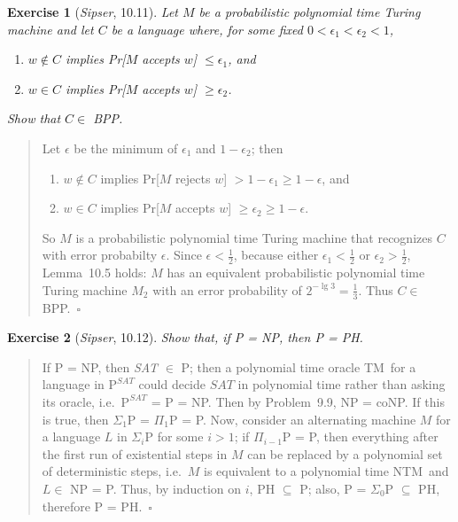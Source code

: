 \documentclass{article}
\theoremstyle{break}			%
\newtheorem{exercise}{Exercise}
\theoremstyle{plain}
\newenvironment{answer}{\begin{quotation}\noindent}{\end{quotation}}
\newcommand{\sipser}{\textit{Sipser}}
\newcommand{\qed}{~\ensuremath{\square}}
\newcommand{\setname}[1]{\textit{#1}}
\newcommand{\TM}{\textsf{TM}}
\newcommand{\NTM}{\textsf{NTM}}
\renewcommand{\P}{\textrm{P}}
\begin{document}
\begin{exercise}[\sipser, 10.11]
Let $M$ be a probabilistic polynomial time Turing machine and let $C$
be a language where, for some fixed $0<\epsilon_1<\epsilon_2<1$,
\begin{enumerate}
\renewcommand{\theenumi}{\alph{enumi}}
\item $w\not\in C$ implies Pr[$M$ accepts $w$] $\leq\epsilon_1$, and
\item $w\in C$ implies Pr[$M$ accepts $w$] $\geq\epsilon_2$.
\end{enumerate}
Show that $C\in$ BPP.
\end{exercise}
\begin{answer}
Let $\epsilon$ be the minimum of $\epsilon_1$ and $1-\epsilon_2$; then
\begin{enumerate}
\renewcommand{\theenumi}{\alph{enumi}}
\item $w\not\in C$ implies Pr[$M$ rejects $w$]
      $>1-\epsilon_1\geq 1-\epsilon$, and
\item $w\in C$ implies Pr[$M$ accepts $w$] $\geq\epsilon_2\geq 1-\epsilon$.
\end{enumerate}
So $M$ is a probabilistic polynomial time Turing machine that
recognizes $C$ with error probabilty $\epsilon$.
Since $\epsilon<\frac 12$, because either $\epsilon_1<\frac 12$ or
$\epsilon_2>\frac 12$, Lemma~10.5 holds: $M$ has an equivalent
probabilistic polynomial time Turing machine $M_2$ with an error
probability of $2^{-\lg 3}=\frac 13$.  Thus $C\in$ BPP.\qed
\end{answer}

\begin{exercise}[\sipser, 10.12]
Show that, if P = NP, then P = PH.
\end{exercise}
\begin{answer}
If P = NP, then \setname{SAT} $\in$ P; then a polynomial time oracle
\TM\ for a language in $\P^{\setname{SAT}}$ could decide
$\setname{SAT}$ in polynomial time rather than asking its oracle,
i.e.~$\P^{\setname{SAT}}$ = P = NP.  Then by Problem~9.9, NP = coNP.
If this is true, then $\Sigma_1$P = $\Pi_1$P = P.  Now, consider an
alternating machine $M$ for a language $L$ in $\Sigma_i$P for some
$i>1$; if $\Pi_{i-1}$P = P, then everything after the first run of
existential steps in $M$ can be replaced by a polynomial set of
deterministic steps, i.e.~$M$ is equivalent to a polynomial time \NTM\
and $L\in$ NP = P.  Thus, by induction on $i$, PH $\subseteq$ P; also,
P = $\Sigma_0$P $\subseteq$ PH, therefore P = PH.\qed
\end{answer}
\end{document}
